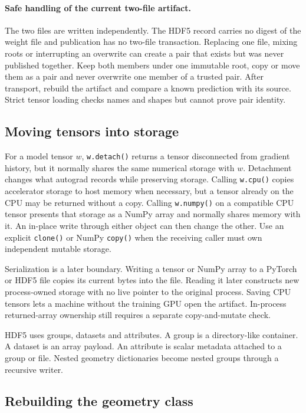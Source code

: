 \documentclass[10pt,aps,prd,twocolumn,nofootinbib]{revtex4-2}
\newcommand{\code}[1]{\texttt{#1}}
\begin{document}
\paragraph{Safe handling of the current two-file artifact.}
The two files are written independently.  The HDF5 record carries no digest of
the weight file and publication has no two-file transaction.  Replacing one
file, mixing roots or interrupting an overwrite can create a pair that exists
but was never published together.  Keep both members under one immutable root,
copy or move them as a pair and never overwrite one member of a trusted pair.
After transport, rebuild the artifact and compare a known prediction with its
source.  Strict tensor loading checks names and shapes but cannot prove pair
identity.

\subsection{Moving tensors into storage}

For a model tensor $w$,
\code{w.detach()} returns a tensor disconnected from gradient history, but it
normally shares the same numerical storage with $w$.  Detachment changes what
autograd records while preserving storage.  Calling \code{w.cpu()} copies
accelerator storage to host memory when necessary, but a tensor already on the
CPU may be returned without a copy.  Calling \code{w.numpy()} on a compatible
CPU tensor presents that storage as a NumPy array and normally shares memory
with it.  An in-place write through either object can then change the other.
Use an explicit \code{clone()} or NumPy \code{copy()} when the receiving caller
must own independent mutable storage.

Serialization is a later boundary.  Writing a tensor or NumPy array to a
PyTorch or HDF5 file copies its current bytes into the file.  Reading it later
constructs new process-owned storage with no live pointer to the original
process.  Saving CPU tensors lets a machine without the training GPU open the
artifact.  In-process returned-array ownership still requires a separate
copy-and-mutate check.

HDF5 uses groups, datasets and attributes.  A group is a directory-like
container.  A dataset is an array payload.  An attribute is scalar metadata
attached to a group or file.  Nested geometry dictionaries become nested
groups through a recursive writer.

\subsection{Rebuilding the geometry class}
\end{document}
